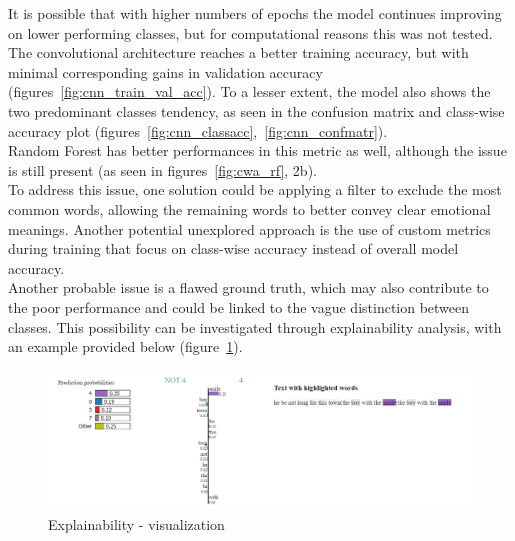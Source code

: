 It is possible that with higher numbers of epochs the model continues improving
on lower performing classes, but for computational reasons this was not tested.\\

The convolutional architecture reaches a better training accuracy, but with minimal
corresponding gains in validation accuracy
(figures~\ref{fig:cnn_train_val_acc}).
To a lesser extent, the model also shows the two predominant classes tendency,
as seen in the confusion matrix and class-wise accuracy plot
(figures~\ref{fig:cnn_classacc},~\ref{fig:cnn_confmatr}).\\

Random Forest has better performances in this metric as well,
although the issue is still present (as seen in
figures~\ref{fig:cwa_rf}, 2b).\\

To address this issue, one solution could be applying a filter to exclude the most
common words, allowing the remaining words to better convey clear emotional
meanings. Another potential unexplored approach is the use of custom
metrics during training that focus on class-wise accuracy instead of overall model
accuracy.\\

Another probable issue is a flawed ground truth, which may
also contribute to the poor performance and could be linked to the vague distinction
between classes.
This possibility can be investigated through explainability analysis, with an
example provided below (figure~\ref{fig:expl}).

\begin{figure}[H]
    \centering
    \includegraphics[scale= 0.55]{pictures/expl.png}
    \caption{Explainability - visualization}
    \label{fig:expl}
\end{figure}


